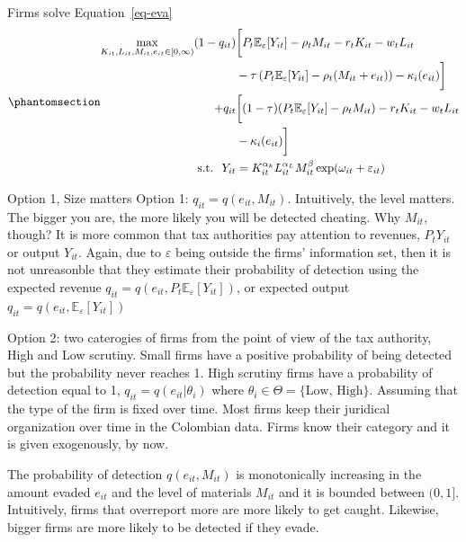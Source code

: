 \documentclass[
  12pt]{article}
\theoremstyle{definition}
\theoremstyle{remark}
\begin{document}
Firms solve Equation~\ref{eq-eva}
\begin{equation}\phantomsection\label{eq-eva}{
\begin{aligned}
  \max_{K_{it},L_{it},M_{it}, e_{it}\in [0,\infty)} (1-q_{it})&\bigg[P_t\mathbb{E}_{\varepsilon}[Y_{it}]-\rho_{t} M_{it}-r_tK_{it}-w_tL_{it}\\
  &-\tau\left(P_t\mathbb{E}_{\varepsilon}[Y_{it}]-\rho_{t} (M_{it}+e_{it})\right)-\kappa_i(e_{it})\bigg]\\
  +q_{it}&\bigg[(1-\tau)(P_t\mathbb{E}_{\varepsilon}[Y_{it}]-\rho_{t} M_{it})-r_tK_{it}-w_tL_{it}\\
  &-\kappa_i(e_{it})\bigg] \\
  \text{s.t. }\; Y_{it}&=K_{it}^{\alpha_k}L_{it}^{\alpha_L}M_{it}^{\beta}\exp(\omega_{it}+\varepsilon_{it})
\end{aligned}
}\end{equation}

\begin{anfxnote}{Option 1, Size matters}
Option 1: \(q_{it}=q(e_{it},M_{it})\). Intuitively, the level matters.
The bigger you are, the more likely you will be detected cheating. Why
\(M_{it}\), though? It is more common that tax authorities pay attention
to revenues, \(P_tY_{it}\) or output \(Y_{it}\). Again, due to
\(\varepsilon\) being outside the firms' information set, then it is not
unreasonble that they estimate their probability of detection using the
expected revenue
\(q_{it}=q(e_{it},P_t\mathbb{E}_{\varepsilon}[Y_{it}])\), or expected
output \(q_{it}=q(e_{it},\mathbb{E}_{\varepsilon}[Y_{it}])\)

Option 2: two caterogies of firms from the point of view of the tax
authority, High and Low scrutiny. Small firms have a positive
probability of being detected but the probability never reaches 1. High
scrutiny firms have a probability of detection equal to 1,
\(q_{it}=q(e_{it}|\theta_{i})\) where
\(\theta_{i}\in\mathbfcal{\Theta}=\{\text{Low, High}\}\). Assuming that
the type of the firm is fixed over time. Most firms keep their juridical
organization over time in the Colombian data. Firms know their category
and it is given exogenously, by now.

\end{anfxnote}

The probability of detection \(q(e_{it}, M_{it})\) is monotonically
increasing in the amount evaded \(e_{it}\) and the level of materials
\(M_{it}\) and it is bounded between \((0,1]\). Intuitively, firms that
overreport more are more likely to get caught. Likewise, bigger firms
are more likely to be detected if they evade.
\end{document}
